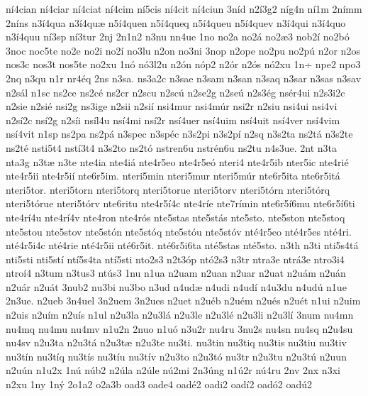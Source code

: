 {n^^ed4cian
n^^ed4ciar
n^^ed4ciat
n^^ed4cim
n^^ed5cis
n^^ed4cit
n^^ed4ciun
3n^^edd
n2^^ed3g2
n^^edg4n
n^^ed1m
2n^^edmm
2n^^edns
n3^^ed4qua
n3^^ed4qu^^e6
n5^^ed4quen
n5^^ed4queq
n5^^ed4queu
n5^^ed4quev
n3^^ed4qui
n3^^ed4quo
n3^^ed4quu
n^^ed3sp
n^^ed3tur
2nj
2n1n2
n3nu
nn4ue
1no
no2a
no2^^e1
no2^^e63
nob2^^ed
no2b^^f3
3noc
noc5te
no2e
no2i
no2^^ed
no3lu
n2on
no3ni
3nop
n2ope
no2pu
no2p^^fa
n2or
n2os
nos3c
nos3t
nos5te
no2xu
1n^^f3
n^^f33l2u
n2^^f3n
n^^f3p2
n2^^f3r
n2^^f3s
n^^f32xu
1n^^f7
npe2
npo3
2nq
n3qu
n1r
nr4^^e9q
2ns
n3sa.
ns3a2c
n3sae
n3sam
n3san
n3saq
n3sar
n3sas
n3sav
n2s^^e1l
n1sc
ns2ce
ns2c^^e9
ns2cr
n2scu
n2sc^^fa
n2se2g
n2se^^fa
n2s3^^e9g
ns^^e9r4ui
n2s3i2c
n2sie
n2si^^e9
nsi2g
ns3ige
n2sii
n2si^^ed
nsi4mur
nsi4m^^far
nsi2r
n2siu
nsi4ui
nsi4vi
n2s^^ed2c
ns^^ed2g
n2s^^edi
ns^^edl4u
ns^^ed4mi
ns^^ed2r
ns^^ed4uer
ns^^ed4uim
ns^^ed4uit
ns^^ed4ver
ns^^ed4vim
ns^^ed4vit
n1sp
ns2pa
ns2p^^e1
n3spec
n3sp^^e9c
n3s2pi
n3s2p^^ed
n2sq
n3s2ta
ns2t^^e1
n3s2te
ns2t^^e9
nsti5t4
nst^^ed3t4
n3s2to
ns2t^^f3
nstren6u
nstr^^e9n6u
ns2tu
n4s3ue.
2nt
n3ta
nta3g
n3t^^e6
n3te
nte4ia
nte4i^^e1
nte4r5eo
nte4r5e^^f3
nteri4
nte4r5ib
nter5ic
nte4ri^^e9
nte4r5ii
nte4r5i^^ed
nte6r5im.
nteri5min
nteri5mur
nteri5m^^far
nte6r5ita
nte6r5it^^e1
nteri5tor.
nteri5torn
nteri5torq
nteri5torue
nteri5torv
nteri5t^^f3rn
nteri5t^^f3rq
nteri5t^^f3rue
nteri5t^^f3rv
nte6ritu
nte4r5^^ed4c
nte4r^^ede
nte7r^^edmin
nte6r5^^ed6mu
nte6r5^^ed6ti
nte4r^^ed4u
nte4r^^ed4v
nte4ron
nte4r^^f3s
nte5stas
nte5st^^e1s
nte5sto.
nte5ston
nte5stoq
nte5stou
nte5stov
nte5st^^f3n
nte5st^^f3q
nte5st^^f3u
nte5st^^f3v
nt^^e94r5eo
nt^^e94r5es
nt^^e94ri.
nt^^e94r5i4c
nt^^e94rie
nt^^e94r5ii
nt^^e96r5it.
nt^^e96r5i6ta
nt^^e95stas
nt^^e95sto.
n3th
n3ti
nti5s4t^^e1
nti5sti
nti5st^^ed
nt^^ed5s4ta
nt^^ed5sti
nto2s3
n2t3^^f3p
nt^^f32s3
n3tr
ntra3e
ntr^^e13e
ntro3i4
ntro^^ed4
n3tum
n3tus3
nt^^fas3
1nu
n1ua
n2uam
n2uan
n2uar
n2uat
n2u^^e1m
n2u^^e1n
n2u^^e1r
n2u^^e1t
3nub2
nu3bi
nu3bo
n3ud
n4ud^^e6
n4udi
n4ud^^ed
n4u3du
n4ud^^fa
n1ue
2n3ue.
n2ueb
3n4uel
3n2uem
3n2ues
n2uet
n2u^^e9b
n2u^^e9m
n2u^^e9s
n2u^^e9t
n1ui
n2uim
n2uis
n2u^^edm
n2u^^eds
n1ul
n2u3la
n2u3l^^e1
n2u3le
n2u3l^^e9
n2u3li
n2u3l^^ed
3num
nu4mn
nu4mq
nu4mu
nu4mv
n1u2n
2nuo
n1u^^f3
n3u2r
nu4ru
3nu2s
nu4sn
nu4sq
n2u4su
nu4sv
n2u3ta
n2u3t^^e1
n2u3t^^e6
n2u3te
nu3ti.
nu3tin
nu3tiq
nu3tis
nu3tiu
nu3tiv
nu3t^^edn
nu3t^^edq
nu3t^^eds
nu3t^^edu
nu3t^^edv
n2u3to
n2u3t^^f3
nu3tr
n2u3tu
n2u3t^^fa
n2uun
n2u^^fan
n1u2x
1n^^fa
n^^fab2
n2^^fala
n2^^fale
n^^fa2mi
2n3^^fang
n1^^fa2r
n^^fa4ru
2nv
2nx
n3xi
n2xu
1ny
1n^^fd
2o1a2
o2a3b
oad3
oade4
oad^^e92
oadi2
oad^^ed2
oad^^f32
oad^^fa2
}
